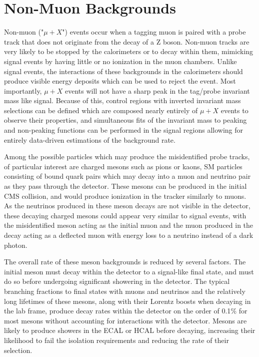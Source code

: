 \section{Non-Muon Backgrounds}
Non-muon ("$\mu+X$") events occur when a tagging muon is paired with a probe track that does not originate from the decay of a Z boson. 
Non-muon tracks are very likely to be stopped by the calorimeters or to decay within them, mimicking signal events by having little or no ionization in the muon chambers. 
Unlike signal events, the interactions of these backgrounds in the calorimeters should produce visible energy deposits which can be used to reject the event.
Most importantly, $\mu+X$ events will not have a sharp peak in the tag/probe invariant mass like signal.
Because of this, control regions with inverted invariant mass selections can be defined which are composed nearly entirely of $\mu+X$ events to observe their properties, and simultaneous fits of the invariant mass to peaking and non-peaking functions can be performed in the signal regions allowing for entirely data-driven estimations of the background rate.

Among the possible particles which may produce the misidentified probe tracks, of particular interest are charged mesons such as pions or kaons, SM particles consisting of bound quark pairs which may decay into a muon and neutrino pair as they pass through the detector.
These mesons can be produced in the initial CMS collision, and would produce ionization in the tracker similarly to muons.
As the neutrinos produced in these meson decays are not visible in the detector, these decaying charged mesons could appear very similar to signal events, with the misidentified meson acting as the initial muon and the muon produced in the decay acting as a deflected muon with energy loss to a neutrino instead of a dark photon.

The overall rate of these meson backgrounds is reduced by several factors.
The initial meson must decay within the detector to a signal-like final state, and must do so before undergoing significant showering in the detector.
The typical branching fractions to final states with muons and neutrinos and the relatively long lifetimes of these mesons, along with their Lorentz boosts when decaying in the lab frame, produce decay rates within the detector on the order of 0.1$\%$ for most mesons without accounting for interactions with the detector.
Mesons are likely to produce showers in the ECAL or HCAL before decaying, increasing their likelihood to fail the isolation requirements and reducing the rate of their selection.

